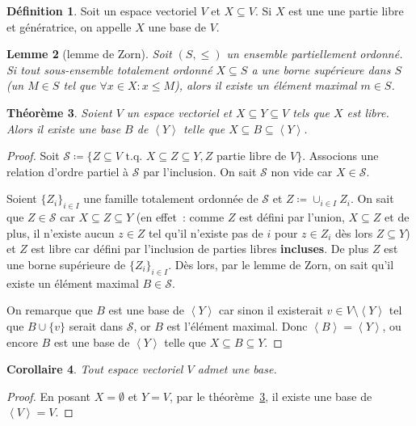 \documentclass{article}
\newcommand{\eng}[1]{\left\langle#1\right\rangle}
\newcommand{\tq}{\textrm{ t.q. }}
\newtheorem{thm}{Théorème}[section]
\newtheorem{cor}[thm]{Corollaire}
\newtheorem{lem}[thm]{Lemme}
\theoremstyle{definition}
\newtheorem{déf}[thm]{Définition}
\theoremstyle{remark}
\begin{document}
		\begin{déf} Soit un espace vectoriel $V$ et $X \subseteq V$. Si $X$ est une une partie libre et génératrice, on appelle $X$ une base de $V$. \end{déf}

		\begin{lem}[lemme de Zorn] Soit $(S, \leq)$ un ensemble partiellement ordonné. Si tout sous-ensemble totalement ordonné $X \subseteq S$ a une borne supérieure
		dans $S$ (un $M \in S$ tel que $\forall x \in X : x \leq M$), alors il existe un élément maximal $m \in S$. \end{lem}

		\begin{thm}\label{existenceBaseEspaceGénéré} Soient $V$ un espace vectoriel et $X \subseteq Y \subseteq V$ tels que $X$ est libre. Alors il existe une base
		$B$ de $\eng Y$ telle que $X \subseteq B \subseteq \eng Y$. \end{thm}

		\begin{proof} Soit $\mathcal S \coloneqq \{Z \subseteq V \tq X \subseteq Z \subseteq Y, Z \text{ partie libre de } V\}$. Associons une relation d'ordre partiel
		à $\mathcal S$ par l'inclusion. On sait $\mathcal S$ non vide car $X \in \mathcal S$.

		Soient $\{Z_i\}_{i \in I}$ une famille totalement ordonnée de $\mathcal S$ et $Z \coloneqq \cup_{i \in I}Z_i$. On sait que $Z \in \mathcal S$ car
		$X \subseteq Z \subseteq Y$ (en effet~: comme $Z$ est défini par l'union, $X \subseteq Z$ et de plus, il n'existe aucun $z \in Z$ tel qu'il n'existe pas de
		$i$ pour $z \in Z_i$ dès lors $Z \subseteq Y$) et $Z$ est libre car défini par l'inclusion de parties libres \textbf{incluses}. De plus $Z$ est une borne
		supérieure de $\{Z_i\}_{i \in I}$. Dès lors, par le lemme de Zorn, on sait qu'il existe un élément maximal $B \in \mathcal S$.

		On remarque que $B$ est une base de $\eng Y$ car sinon il existerait $v \in V \setminus \eng Y$ tel que $B \cup \{v\}$ serait dans $\mathcal S$, or $B$
		est l'élément maximal. Donc $\eng B = \eng Y$, ou encore $B$ est une base de $\eng Y$ telle que $X \subseteq B \subseteq Y$. \end{proof}

		\begin{cor} Tout espace vectoriel $V$ admet une base. \end{cor}

		\begin{proof} En posant $X = \emptyset$ et $Y = V$, par le théorème~\ref{existenceBaseEspaceGénéré}, il existe une base de $\eng V = V$. \end{proof}
\end{document}
